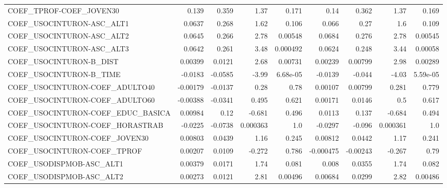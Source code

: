 \begin{tabular}{lrrrrrrrr}
COEF\_TPROF-COEF\_JOVEN30           &       0.139 &        0.359 &     1.37 &    0.171 &       0.14 &       0.362 &         1.37 &         0.169 \\
COEF\_USOCINTURON-ASC\_ALT1         &      0.0637 &        0.268 &     1.62 &    0.106 &      0.066 &        0.27 &          1.6 &         0.109 \\
COEF\_USOCINTURON-ASC\_ALT2         &      0.0645 &        0.266 &     2.78 &  0.00548 &     0.0684 &       0.276 &         2.78 &       0.00545 \\
COEF\_USOCINTURON-ASC\_ALT3         &      0.0642 &        0.261 &     3.48 & 0.000492 &     0.0624 &       0.248 &         3.44 &       0.00058 \\
COEF\_USOCINTURON-B\_DIST           &     0.00399 &       0.0121 &     2.68 &  0.00731 &    0.00239 &     0.00799 &         2.98 &       0.00289 \\
COEF\_USOCINTURON-B\_TIME           &     -0.0183 &      -0.0585 &    -3.99 & 6.68e-05 &    -0.0139 &      -0.044 &        -4.03 &      5.59e-05 \\
COEF\_USOCINTURON-COEF\_ADULTO40    &    -0.00179 &      -0.0137 &     0.28 &     0.78 &    0.00107 &     0.00799 &        0.281 &         0.779 \\
COEF\_USOCINTURON-COEF\_ADULTO60    &    -0.00388 &      -0.0341 &    0.495 &    0.621 &    0.00171 &      0.0146 &          0.5 &         0.617 \\
COEF\_USOCINTURON-COEF\_EDUC\_BASICA &     0.00984 &         0.12 &   -0.681 &    0.496 &     0.0113 &       0.137 &       -0.684 &         0.494 \\
COEF\_USOCINTURON-COEF\_HORASTRAB   &     -0.0225 &      -0.0738 & 0.000363 &      1.0 &    -0.0297 &      -0.096 &     0.000361 &           1.0 \\
COEF\_USOCINTURON-COEF\_JOVEN30     &     0.00803 &       0.0439 &     1.16 &    0.245 &    0.00812 &      0.0442 &         1.17 &         0.241 \\
COEF\_USOCINTURON-COEF\_TPROF       &     0.00207 &       0.0109 &   -0.272 &    0.786 &  -0.000475 &    -0.00243 &       -0.267 &          0.79 \\
COEF\_USODISPMOB-ASC\_ALT1          &     0.00379 &       0.0171 &     1.74 &    0.081 &      0.008 &      0.0355 &         1.74 &         0.082 \\
COEF\_USODISPMOB-ASC\_ALT2          &     0.00273 &       0.0121 &     2.81 &  0.00496 &    0.00684 &      0.0299 &         2.82 &       0.00486 \\

\end{tabular}
